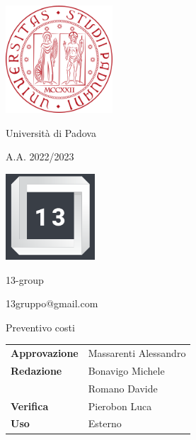 \documentclass{article}
\begin{document}
\begin{center}
    
    \includegraphics[width=0.3\textwidth]{immagini/logo_unipd.png}

    Università di Padova
    
    A.A. 2022/2023
    
    \vspace{4cm}

    \includegraphics[width=0.25\textwidth]{immagini/logo_13.png}
    
    \Large 13-group

    \small 13gruppo@gmail.com
        
    \vspace{2cm}

    \Huge Preventivo costi
        
    \vspace{2cm}
    
    \normalsize
    \begin{center}
        \begin{tabularx}{7cm}{l | X}            
            \textbf{Approvazione} & Massarenti Alessandro\\
            \textbf{Redazione} & Bonavigo Michele \\
            & Romano Davide\\
            \textbf{Verifica} & Pierobon Luca\\
            \textbf{Uso} & Esterno\\
        \end{tabularx}
    \end{center}
        
\end{center}

\newpage

\tableofcontents

\newpage


\end{document}
